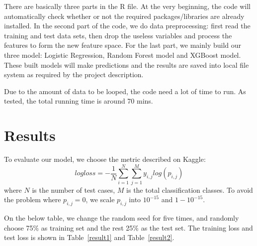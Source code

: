 \documentclass[12pt]{article}
\begin{document}
There are basically three parts in the R file. At the very beginning, the code will automatically check whether or not the required packages/libraries are already installed. In the second part of the code, we do data preprocessing: first read the training and test data sets, then drop the useless variables and process the features to form the new feature space. For the last part, we mainly build our three model: Logistic Regression, Random Forest model and XGBoost model. These built models will make predictions and the results are saved into local file system as required by the project description.

Due to the amount of data to be looped, the code need a lot of time to run. As tested, the total running time is around 70 mins.

\section{Results}

\quad To evaluate our model, we choose the metric described on Kaggle:
\begin{equation}
logloss = - \frac{1}{N} \sum_{i=1}^N \sum_{j=1}^M y_{i, j} log(p_{i, j})
\end{equation}
where $N$ is the number of test cases, $M$ is the total classification classes. To avoid the problem where $p_{i, j} = 0$, we scale $p_{i, j}$ into $10 ^ {-15}$ and $1 - 10 ^ {-15}$.

On the below table, we change the random seed for five times, and randomly choose 75\% as training set and the rest 25\% as the test set. The training loss and test loss is shown in Table~\ref{result1} and Table~\ref{result2}.
\end{document}
